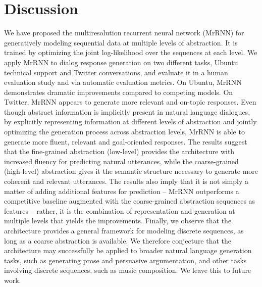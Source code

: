 \documentclass{article}
\begin{document}
\section{Discussion}
We have proposed the multiresolution recurrent neural network (MrRNN) for generatively modeling sequential data at multiple levels of abstraction. It is trained by optimizing the joint log-likelihood over the sequences at each level.
We apply MrRNN to dialog response generation on two different tasks, Ubuntu technical support and Twitter conversations, and evaluate it in a human evaluation study and via automatic evaluation metrics.
On Ubuntu, MrRNN demonstrates dramatic improvements compared to competing models.
On Twitter, MrRNN appears to generate more relevant and on-topic responses.
Even though abstract information is implicitly present in natural language dialogues,
by explicitly representing information at different levels of abstraction and jointly optimizing the generation process across abstraction levels,
MrRNN is able to generate more fluent, relevant and goal-oriented responses.
The results suggest that the fine-grained abstraction (low-level) provides the architecture with increased fluency for predicting natural utterances,
while the coarse-grained (high-level) abstraction gives it the semantic structure necessary to generate more coherent and relevant utterances.
The results also imply that it is not simply a matter of adding additional features for prediction -- MrRNN outperforms a competitive baseline augmented with the coarse-grained abstraction sequences as features -- rather, it is the combination of representation and generation at multiple levels that yields the improvements.
Finally, we observe that the architecture provides a general framework for modeling discrete sequences, as long as a coarse abstraction is available.
We therefore conjecture that the architecture may successfully be applied to broader natural language generation tasks, such as generating prose and persuasive argumentation, and other tasks involving discrete sequences, such as music composition.
We leave this to future work.






















%
 
\end{document}
